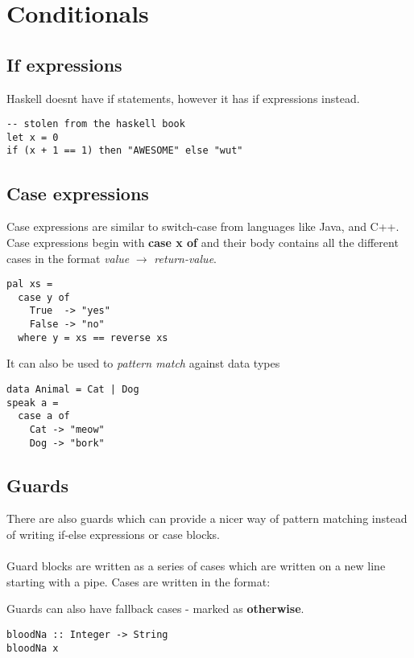 \section{Conditionals}
\subsection{If expressions}
Haskell doesnt have if statements, however it has if expressions instead.

\begin{lstlisting}
-- stolen from the haskell book
let x = 0
if (x + 1 == 1) then "AWESOME" else "wut"
\end{lstlisting}

\subsection{Case expressions}
Case expressions are similar to switch-case from languages like Java, and C++. Case expressions begin with \textbf{case x of} and their body contains all the different
cases in the format \emph{value} $\rightarrow$ \emph{return-value}.

\begin{lstlisting}
pal xs =
  case y of
    True  -> "yes"
    False -> "no"
  where y = xs == reverse xs
\end{lstlisting}

It can also be used to \emph{pattern match} against data types
\begin{lstlisting}
data Animal = Cat | Dog
speak a =
  case a of
    Cat -> "meow"
    Dog -> "bork"
\end{lstlisting}

\newpage
\subsection{Guards}
There are also guards which can provide a nicer way of pattern matching instead of writing if-else expressions or case blocks.\\\\Guard blocks are written as a series of
cases which are written on a new line starting with a pipe. Cases are written in the format:


Guards can also have fallback cases - marked as \textbf{otherwise}.

\begin{lstlisting}
bloodNa :: Integer -> String
bloodNa x

\end{lstlisting}


